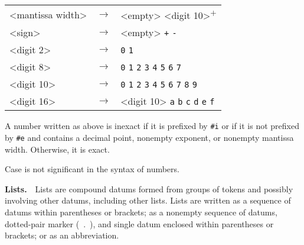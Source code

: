 {\begin{tabular}[H]{lcl}
\textless{}mantissa width\textgreater{} & \(\longrightarrow\) & \textless{}empty\textgreater{} \textbar{} \texttt{\textbar{}} \textless{}digit 10\textgreater{}\textsuperscript{+} \\

\textless{}sign\textgreater{} & \(\longrightarrow\) & \textless{}empty\textgreater{} \textbar{} \texttt{+} \textbar{} \texttt{-} \\

\textless{}digit 2\textgreater{} & \(\longrightarrow\) & \texttt{0} \textbar{} \texttt{1} \\

\textless{}digit 8\textgreater{} & \(\longrightarrow\) & \texttt{0} \textbar{} \texttt{1} \textbar{} \texttt{2} \textbar{} \texttt{3} \textbar{} \texttt{4}
                     \textbar{} \texttt{5} \textbar{} \texttt{6} \textbar{} \texttt{7} \\

\textless{}digit 10\textgreater{} & \(\longrightarrow\) & \texttt{0} \textbar{} \texttt{1} \textbar{} \texttt{2} \textbar{} \texttt{3} \textbar{} \texttt{4}
                     \textbar{} \texttt{5} \textbar{} \texttt{6} \textbar{} \texttt{7} \textbar{} \texttt{8} \textbar{} \texttt{9} \\

\textless{}digit 16\textgreater{} & \(\longrightarrow\) & \textless{}digit 10\textgreater{} \textbar{} \texttt{a} \textbar{} \texttt{b}
               \textbar{} \texttt{c} \textbar{} \texttt{d} \textbar{} \texttt{e}
               \textbar{} \texttt{f}
 \\
\end{tabular}
}


A number written as above is inexact if it is prefixed by \texttt{\#{}i}
or if it is not prefixed by \texttt{\#{}e} and contains a decimal point,
nonempty exponent, or nonempty mantissa width.
Otherwise, it is exact.


Case is not significant in the syntax of numbers.


\textbf{Lists\label{grammar_grammar_lists}.}  \label{grammar_s19}\label{grammar_s20}\label{grammar_s21}Lists are compound datums formed from groups of tokens and possibly
involving other datums, including other lists.
Lists are written as a sequence of datums within parentheses
or brackets; as a nonempty sequence of datums,
dotted-pair marker ( . ), and single datum enclosed within
parentheses or brackets; or as an abbreviation.


